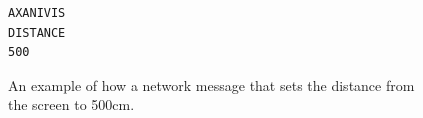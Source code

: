 \documentclass[12pt,a4paper,notitlepage]{report}
\begin{document}

\begin{figure}[h]
  \lstset{%
    basicstyle=\ttfamily\bfseries,
    xleftmargin=.4\textwidth, xrightmargin=.2\textwidth
  }
\begin{lstlisting}
AXANIVIS
DISTANCE
500
\end{lstlisting}
\caption{An example of how a network message that sets the distance from the screen to 500cm.
\label{fig:example_message}}
\end{figure}
\end{document}
